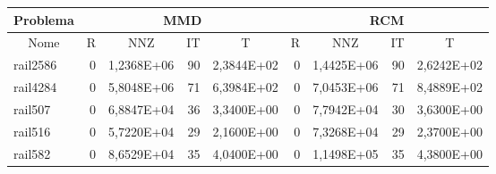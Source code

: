 \begin{tabular}{|l|r|r|r|r|r|r|r|r|}
\hline
\multicolumn{1}{|c|}{Problema} & \multicolumn{4}{|c|}{MMD} &         \multicolumn{4}{|c|}{RCM} \\ \hline
\multicolumn{1}{|c|}{Nome} & \multicolumn{1}{|c|}{R} &
        \multicolumn{1}{|c|}{NNZ} & \multicolumn{1}{|c|}{IT} &
        \multicolumn{1}{|c|}{T} & \multicolumn{1}{|c|}{R} &
        \multicolumn{1}{|c|}{NNZ} & \multicolumn{1}{|c|}{IT} &
        \multicolumn{1}{|c|}{T} \\ \hline
rail2586 & 0 & 1,2368E+06 & 90 & 2,3844E+02 & 0 & 1,4425E+06 & 90 & 2,6242E+02 \\ \hline
rail4284 & 0 & 5,8048E+06 & 71 & 6,3984E+02 & 0 & 7,0453E+06 & 71 & 8,4889E+02 \\ \hline
rail507 & 0 & 6,8847E+04 & 36 & 3,3400E+00 & 0 & 7,7942E+04 & 30 & 3,6300E+00 \\ \hline
rail516 & 0 & 5,7220E+04 & 29 & 2,1600E+00 & 0 & 7,3268E+04 & 29 & 2,3700E+00 \\ \hline
rail582 & 0 & 8,6529E+04 & 35 & 4,0400E+00 & 0 & 1,1498E+05 & 35 & 4,3800E+00 \\ \hline
\end{tabular}
